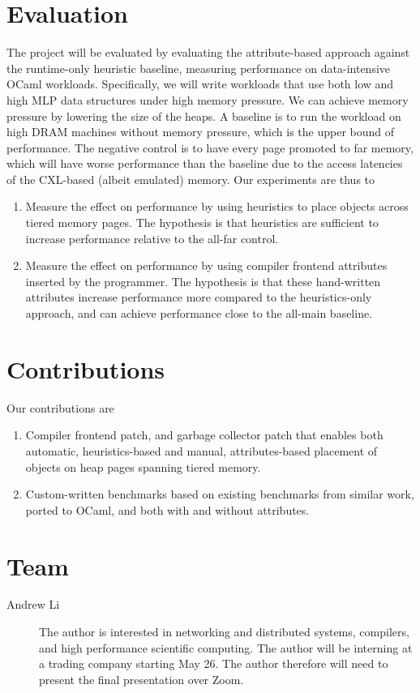 \documentclass[sigconf]{acmart}
\begin{document}
\section{Evaluation}
The project will be evaluated by evaluating the attribute-based approach against the runtime-only heuristic baseline, measuring performance on data-intensive OCaml workloads. Specifically, we will write workloads that use both low and high MLP data structures under high memory pressure. We can achieve memory pressure by lowering the size of the heaps. A baseline is to run the workload on high DRAM machines without memory pressure, which is the upper bound of performance. The negative control is to have every page promoted to far memory, which will have worse performance than the baseline due to the access latencies of the CXL-based (albeit emulated) memory. Our experiments are thus to
\begin{enumerate}
  \item Measure the effect on performance by using heuristics to place objects across tiered memory pages. The hypothesis is that heuristics are sufficient to increase performance relative to the all-far control.
  \item Measure the effect on performance by using compiler frontend attributes inserted by the programmer. The hypothesis is that these hand-written attributes increase performance more compared to the heuristics-only approach, and can achieve performance close to the all-main baseline.
\end{enumerate}

\section{Contributions}
Our contributions are
\begin{enumerate}
  \item Compiler frontend patch, and garbage collector patch that enables both automatic, heuristics-based and manual, attributes-based placement of objects on heap pages spanning tiered memory.
  \item Custom-written benchmarks based on existing benchmarks from similar work, ported to OCaml, and both with and without attributes.
\end{enumerate}

\section{Team}
\begin{description}
  \item[Andrew Li] The author is interested in networking and distributed systems, compilers, and high performance scientific computing. The author will be interning at a trading company starting May 26. The author therefore will need to present the final presentation over Zoom.
\end{description}
\end{document}
